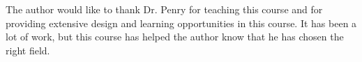 \documentclass[prodmode,acmtecs]{acmsmall} %
\begin{document}
\begin{acks}
The author would like to thank Dr. Penry for teaching this course and for
providing extensive design and learning opportunities in this course. It has
been a lot of work, but this course has helped the author know that he has
chosen the right field.
\end{acks}




\end{document}
